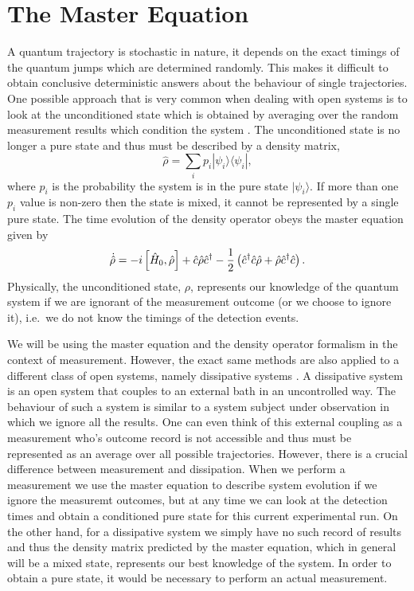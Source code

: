 
\section{The Master Equation}

A quantum trajectory is stochastic in nature, it depends on the exact
timings of the quantum jumps which are determined randomly. This makes
it difficult to obtain conclusive deterministic answers about the
behaviour of single trajectories. One possible approach that is very
common when dealing with open systems is to look at the unconditioned
state which is obtained by averaging over the random measurement
results which condition the system \cite{MeasurementControl}. The
unconditioned state is no longer a pure state and thus must be
described by a density matrix,
\begin{equation}
  \label{eq:rho}
  \hat{\rho} = \sum_i p_i | \psi_i \rangle \langle \psi_i |,
\end{equation}
where $p_i$ is the probability the system is in the pure state
$| \psi_i \rangle$. If more than one $p_i$ value is non-zero then the
state is mixed, it cannot be represented by a single pure state. The
time evolution of the density operator obeys the master equation given
by
\begin{equation}
  \dot{\hat{\rho}} = -i \left[ \hat{H}_0, \hat{\rho} \right] + \hat{c}
  \hat{\rho} \hat{c}^\dagger - \frac{1}{2} \left( \hat{c}^\dagger \hat{c} \hat{\rho} + \hat{\rho}
    \hat{c}^\dagger \hat{c} \right).
\end{equation}
Physically, the unconditioned state, $\rho$, represents our knowledge
of the quantum system if we are ignorant of the measurement outcome
(or we choose to ignore it), i.e.~we do not know the timings of the
detection events. 

We will be using the master equation and the density operator
formalism in the context of measurement. However, the exact same
methods are also applied to a different class of open systems, namely
dissipative systems \cite{QuantumNoise}. A dissipative system is an
open system that couples to an external bath in an uncontrolled
way. The behaviour of such a system is similar to a system subject
under observation in which we ignore all the results. One can even
think of this external coupling as a measurement who's outcome record
is not accessible and thus must be represented as an average over all
possible trajectories. However, there is a crucial difference between
measurement and dissipation. When we perform a measurement we use the
master equation to describe system evolution if we ignore the
measuremt outcomes, but at any time we can look at the detection times
and obtain a conditioned pure state for this current experimental
run. On the other hand, for a dissipative system we simply have no
such record of results and thus the density matrix predicted by the
master equation, which in general will be a mixed state, represents
our best knowledge of the system. In order to obtain a pure state, it
would be necessary to perform an actual measurement.

